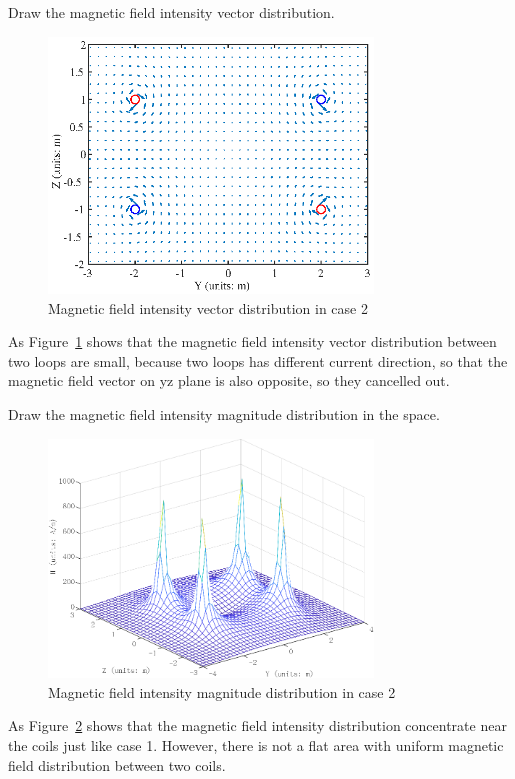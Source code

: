 \documentclass[10pt, journal, final]{IEEEtran}
\begin{document}
Draw the magnetic field intensity vector distribution.

\begin{figure}[htbp]
    \centering
    \includegraphics[width = 3.4in]{figures-3/work2.1.eps}
    \caption{Magnetic field intensity vector distribution in case 2}
    \label{fig:2.1}
\end{figure}
As Figure~\ref{fig:2.1} shows that the magnetic field intensity vector distribution between two loops are small, 
because two loops has different current direction, so that the magnetic field vector on yz plane is also opposite, 
so they cancelled out.\\\par

Draw the magnetic field intensity magnitude distribution in the space.


\begin{figure}[htbp]
    \centering
    \includegraphics[width = 3.4in]{figures-3/work2.2.eps}
    \caption{Magnetic field intensity magnitude distribution in case 2}
    \label{fig:2.2}
\end{figure}
As Figure~\ref{fig:2.2} shows that the magnetic field intensity distribution concentrate near the coils just like case 1.
However, there is not a flat area with uniform magnetic field distribution between two coils.\\\par
\end{document}
